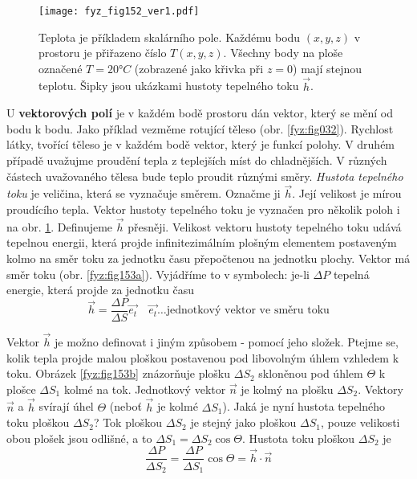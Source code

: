     \begin{figure}[ht!]
      \centering
      \texttt{[image: fyz\_fig152\_ver1.pdf]}
      \caption{Teplota je příkladem skalárního pole. Každému bodu $(x,y,z)$ v prostoru je 
              přiřazeno číslo $T(x,y,z)$. Všechny body na ploše označené $T = 20°C$ (zobrazené 
              jako křivka při $z=0$) mají stejnou teplotu. Šipky jsou ukázkami hustoty tepelného 
              toku $\vec{h}$.
              \cite[s.~29]{Feynman02}}
      \label{fyz:fig152} 
    \end{figure}
          
    U \textbf{vektorových polí} je v každém bodě prostoru dán vektor, který se mění od bodu k
    bodu. Jako příklad vezměme rotující těleso (obr. \ref{fyz:fig032}). Rychlost látky, tvořící
    těleso je v každém bodě vektor, který je funkcí polohy. V druhém případě uvažujme proudění
    tepla z teplejších míst do chladnějších. V různých částech uvažovaného tělesa bude teplo
    proudit různými směry. \emph{Hustota tepelného toku} je veličina, která se vyznačuje směrem.
    Označme ji $\vec{h}$. Její velikost je mírou proudícího tepla. Vektor hustoty tepelného toku
    je vyznačen pro několik poloh i na obr. \ref{fyz:fig152}. Definujeme $\vec{h}$ přesněji.
    Velikost vektoru hustoty tepelného toku udává tepelnou energii, která projde infinitezimálním
    plošným elementem postaveným kolmo na směr toku za jednotku času přepočtenou na  jednotku
    plochy. Vektor má směr toku (obr. \ref{fyz:fig153a}). Vyjádříme to v symbolech: je-li $\Delta
    P$ tepelná energie, která projde za jednotku času
    \begin{equation*}     %
      \vec{h}=\frac{\Delta P}{\Delta S}\vec{e_t}
              \quad \vec{e_t}\ldots\text{jednotkový vektor ve směru toku}
    \end{equation*}   

          
    Vektor $\vec{h}$ je možno definovat i jiným způsobem - pomocí jeho složek. Ptejme se, kolik 
    tepla projde malou ploškou postavenou pod libovolným úhlem vzhledem k toku. Obrázek 
    \ref{fyz:fig153b} znázorňuje plošku $\Delta S_2$ skloněnou pod úhlem $\Theta$ k plošce 
    $\Delta S_1$ kolmé na tok. Jednotkový vektor $\vec{n}$ je kolmý na plošku $\Delta S_2$. 
    Vektory $\vec{n}$ a $\vec{h}$ svírají úhel $\Theta$ (neboť $\vec{h}$ je kolmé $\Delta 
    S_1$). Jaká je nyní hustota tepelného toku ploškou $\Delta S_2$? Tok ploškou $\Delta S_2$ je 
    stejný jako ploškou $\Delta S_1$, pouze velikosti obou plošek jsou odlišné, a to $\Delta 
    S_1=\Delta S_2\cos\Theta$. Hustota toku ploškou $\Delta S_2$ je 
    \begin{equation}\label{fyz:eq248}
      \frac{\Delta P}{\Delta S_2}=\frac{\Delta P}{\Delta S_1}\cos{\Theta}=\vec{h}\cdot\vec{n}
    \end{equation}

